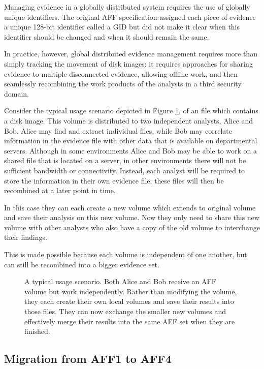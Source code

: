 \documentclass[10pt, conference]{IEEEtran}
\begin{document}
Managing evidence in a globally distributed system requires the use of
globally unique identifiers. The original AFF specification assigned
each piece of evidence a unique 128-bit identifier called a GID but did
not make it clear when this identifier should be changed and when it
should remain the same. 

In practice, however, global distributed evidence management requires
more than simply tracking the movement of disk images: it requires
approaches for sharing evidence to multiple disconnected
evidence, allowing offline work, and then seamlessly recombining the
work products of the analysts in a third security domain.

Consider the typical usage scenario depicted in Figure \ref{usage}, of
an file which contains a disk image. This volume is distributed to two
independent analysts, Alice and Bob. Alice may find and extract
individual files, while Bob may correlate information in the evidence
file with other data that is available on departmental
servers. Although in some environments Alice and Bob may be able to
work on a shared file that is located on a server, in other
environments there will not be sufficient bandwidth or
connectivity. Instead, each analyst will be required to store the
information in their own evidence file; these files will then be
recombined at a later point in time.

In this case they can
each create a new volume which extends to original volume and save
their analysis on this new volume. Now they only need to share this
new volume with other analysts who also have a copy of the old volume
to interchange their findings. 

This is made possible because each volume is independent of one
another, but can still be recombined into a bigger evidence set. 

\begin{figure}[tb]
  \begin{center}
  \mbox{\columnwidth {}}
  \caption{A typical usage scenario. Both Alice and Bob receive an AFF
  volume but work independently. Rather than modifying the volume,
  they each create their own local volumes and save their results into
  those files. They can now exchange the smaller new volumes and
  effectively merge their results into the same AFF set when they are finished.}
  \label{usage}
  \end{center}
\end{figure}

\subsection{Migration from AFF1 to AFF4}
\end{document}
